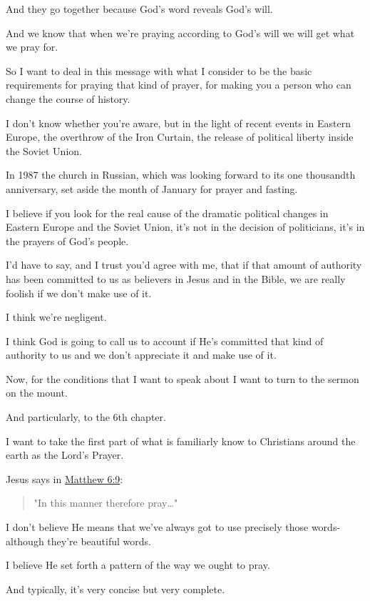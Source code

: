 \documentclass[11pt]{article}
\begin{document}
And they go together because God's word
reveals God's will.

And we know that when we're praying according
to God's will we will get what we pray for.

So I want to deal in this message with what I
consider to be the basic requirements for
praying that kind of prayer, for making you a
person who can change the course of history.

I don't know whether you're aware, but in the
light of recent events in Eastern Europe, the
overthrow of the Iron Curtain, the release of
political liberty inside the Soviet Union.

In 1987 the church in Russian, which was
looking forward to its one thousandth
anniversary, set aside the month of January
for prayer and fasting.

I believe if you look for the real cause of
the dramatic political changes in Eastern
Europe and the Soviet Union, it's not in the
decision of politicians, it's in the prayers
of God's people.

I'd have to say, and I trust you'd agree with
me, that if that amount of authority has been
committed to us as believers in Jesus and in
the Bible, we are really foolish if we don't
make use of it.

I think we're negligent.

I think God is going to call us to account if
He's committed that kind of authority to us
and we don't appreciate it and make use of it.

Now, for the conditions that I want to speak
about I want to turn to the sermon on the
mount.

And particularly, to the 6th chapter.

I want to take the first part of what is
familiarly know to Christians around the earth
as the Lord's Prayer.

Jesus says in \href{https://www.biblegateway.com/passage/?search=Matthew\%206\%3A9\&version=ESV}{Matthew 6:9}:

\begin{quote}
"In this manner therefore pray\ldots{}"
\end{quote}

I don't believe He means that we've always
got to use precisely those words-although
they're beautiful words.

I believe He set forth a pattern of the way we
ought to pray.

And typically, it's very concise but very
complete.
\end{document}
